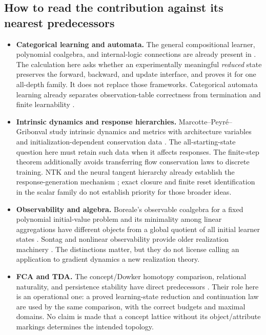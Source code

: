 \documentclass[11pt]{article}
\theoremstyle{definition}\newtheorem{definition}[theorem]{Definition}
\theoremstyle{remark}\newtheorem{remark}[theorem]{Remark}
\begin{document}
\subsection{How to read the contribution against its nearest predecessors}
\begin{itemize}[leftmargin=*]
\item \textbf{Categorical learning and automata.}
The general compositional learner, polynomial coalgebra, and internal-logic
connections are already present in \cite{fong,cruttwell,spivaklanguages,spivak2026}.
The calculation here asks whether an experimentally meaningful \emph{reduced}
state preserves the forward, backward, and update interface, and proves it
for one all-depth family. It does not replace those frameworks. Categorical
automata learning already separates observation-table correctness from
termination and finite learnability \cite{calf}.
\item \textbf{Intrinsic dynamics and response hierarchies.}
Marcotte--Peyr\'e--Gribonval study intrinsic dynamics and metrics with
architecture variables and initialization-dependent conservation data
\cite{marcotte}. The all-starting-state question here must retain such data
when it affects responses. The finite-step theorem additionally avoids
transferring flow conservation laws to discrete training. NTK and the neural
tangent hierarchy already establish the response-generation mechanism
\cite{jacot,huang}; exact closure and finite reset identification in the
scalar family do not establish priority for those broader ideas.
\item \textbf{Observability and algebra.}
Boreale's observable coalgebra for a fixed polynomial initial-value problem
and its minimality among linear aggregations have different objects from a
global quotient of all initial learner states \cite{boreale}. Sontag and
nonlinear observability provide older realization machinery
\cite{sontag,hermann,kawano}. The distinctions matter, but they do not license
calling an application to gradient dynamics a new realization theory.
\item \textbf{FCA and TDA.}
The concept/Dowker homotopy comparison, relational naturality, and persistence
stability have direct predecessors \cite{ayzenberg,brun,dowker,gratus,shen}.
Their role here is an operational one: a proved learning-state reduction and
continuation law are used by the same comparison, with the correct budgets
and maximal domains. No claim is made that a concept lattice without its
object/attribute markings determines the intended topology.
\end{itemize}
\end{document}
